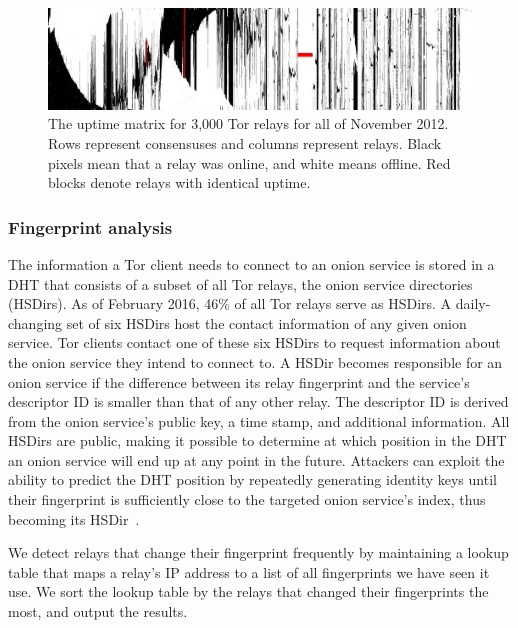 \begin{figure}[t]
	\centering
	\includegraphics[width=\linewidth]{diagrams/2012-11.jpg}
	\caption{The uptime matrix for 3,000 Tor relays for all of November 2012.
	Rows represent consensuses and columns represent relays.  Black pixels mean
	that a relay was online, and white means offline.  Red blocks denote relays
	with identical uptime.}
	\label{fig:uptime-matrix}
\end{figure}

\subsubsection{Fingerprint analysis}
\label{sec:fingerprint-analysis}
The information a Tor client needs to connect to an onion service is stored in a
DHT that consists of a subset of all Tor relays, the onion service directories
(HSDirs).  As of February 2016, 46\% of all Tor relays serve as HSDirs.  A
daily-changing set of six HSDirs host the contact information of any given
onion service.  Tor clients contact one of these six HSDirs to request
information about the onion service they intend to connect to.  A HSDir becomes
responsible for an onion service if the difference between its relay fingerprint
and the service's descriptor ID is smaller than that of any other relay.  The
descriptor ID is derived from the onion service's public key, a time stamp, and
additional information.
All HSDirs are public, making it possible to determine at which position in the
DHT an onion service will end up at any point in the future.  Attackers can
exploit the ability to predict the DHT position by repeatedly generating
identity keys until their fingerprint is sufficiently close to the targeted
onion service's index, thus becoming its HSDir~\cite[\S~V.A]{Biryukov2013a}.

We detect relays that change their fingerprint frequently by maintaining a
lookup table that maps a relay's IP address to a list of all fingerprints we
have seen it use.  We sort the lookup table by the relays that changed their
fingerprints the most, and output the results.


